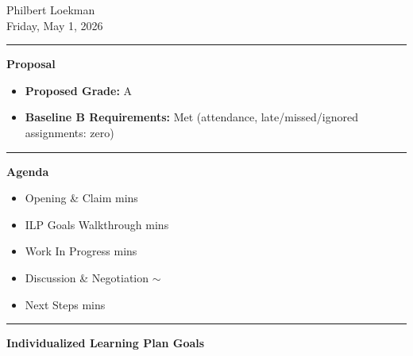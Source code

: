 \documentclass[10pt]{article}
\begin{document}
\thispagestyle{fancy}
\vspace{-12pt}

Philbert Loekman\\
Friday, May 1, 2026

\vspace{4pt}\hrule\vspace{5pt}

\textbf{Proposal}

\begin{small}
\begin{itemize}
  \item \textbf{Proposed Grade:} A
  \item \textbf{Baseline B Requirements:} Met (attendance, late/missed/ignored assignments: zero)
\end{itemize}
\end{small}

\vspace{3pt}\hrule\vspace{5pt}

\textbf{Agenda}

\begin{small}
\begin{itemize}
  \item Opening \& Claim  mins
  \item ILP Goals Walkthrough  mins
  \item Work In Progress  mins
  \item Discussion \& Negotiation \dotfill $\sim$
  \item Next Steps  mins
\end{itemize}
\end{small}

\vspace{3pt}\hrule\vspace{5pt}

\textbf{Individualized Learning Plan Goals}
\end{document}
